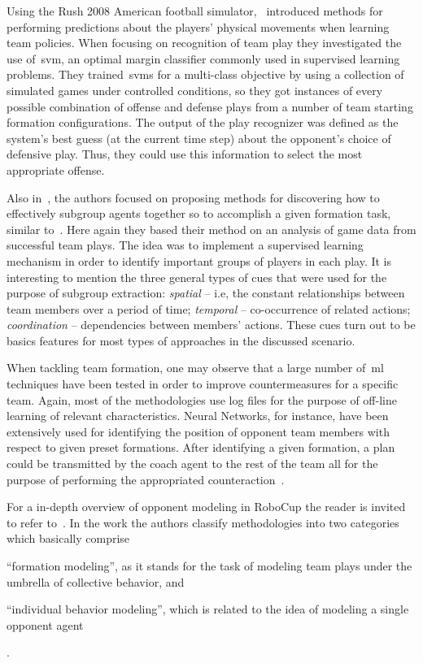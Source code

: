 Using the Rush 2008 American football simulator,~\cite{laviersa_using_2014} introduced methods for performing predictions about the players' physical movements when learning team policies. When focusing on recognition of team play they investigated the use of~\gls{svm}, an optimal margin classifier commonly used in supervised learning problems. They trained~\glspl{svm} for a multi-class objective by using a collection of simulated games under controlled conditions, so they got instances of every possible combination of offense and defense plays from a number of team starting formation configurations. The output of the play recognizer was defined as the system's best guess (at the current time step) about the opponent's choice of defensive play. Thus, they could use this information to select the most appropriate offense.

Also in~\cite{laviersa_using_2014}, the authors focused on proposing methods for discovering how to effectively  subgroup agents together so to accomplish a given formation task, similar to~\cite{stone_task_1999}. Here again they based their method on an analysis of game data from successful team plays. The idea was to implement a supervised learning mechanism in order to identify important groups of players in each play. It is interesting to mention the three general types of cues that were used for the purpose of subgroup extraction: \textit{spatial} -- i.e, the constant relationships between team members over a period of time; \textit{temporal} -- co-occurrence of related actions; \textit{coordination} -- dependencies between members' actions. These cues turn out to be basics features for most types of approaches in the discussed scenario.

When tackling team formation, one may observe that a large number of~\gls{ml} techniques have been tested in order to improve countermeasures for a specific team. Again, most of the methodologies use log files for the purpose of off-line learning of relevant characteristics. Neural Networks, for instance, have been extensively used for identifying the position of opponent team members with respect to given preset formations. After identifying a given formation, a plan could be transmitted by the coach agent to the rest of the team all for the purpose of performing the appropriated counteraction~\citep{nakashima_off-line_2010,ramos_discovering_2008, faria_machine_2010, visser_recognizing_2001}.

For a in-depth overview of opponent modeling in RoboCup the reader is invited to refer to~\cite{rofer_overview_2012}. In the work the authors classify methodologies into two categories which basically comprise \begin{inparaenum}\item``formation modeling'', as it stands for the task of modeling team plays under the umbrella of collective behavior, and \item``individual behavior modeling'', which is related to the idea of modeling a single opponent agent\end{inparaenum}.

